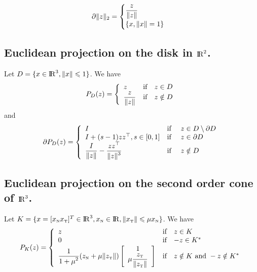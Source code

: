 \begin{equation}
  \label{eq:sub-norm}
  \partial \|z\|_2 =
  \begin{cases}
      \Frac z {\|z\|}\\
      \{x, \|x\|=1 \}
    \end{cases}
\end{equation}
\subsection{Euclidean projection on the disk  in $\mathrm{I\!R}^2$.}
Let $D=\{x \in \mathrm{I\!R}^3, \|x\| \leqslant 1\}$. We have 
\begin{equation}
  \label{eq:projD}
  P_{D}(z) =\left\{
  \begin{array}{lcl}
    z &\text{if}& z \in D \\
    \Frac {z} {\|z\|}& \text{if}&z \notin D
    \end{array}\right. 
  \end{equation}
 and
\begin{equation}
  \label{eq:sub-projD}
  \partial P_{D}(z) =\left\{
  \begin{array}{lcl}
   I &\text{if }& z \in D \setminus \partial D \\
   I + (s-1)z z^\top , s\in [0,1]   &\text{if }& z \in  \partial D \\
   \Frac I {\|z\|} - \Frac{z z^\top}{\|z\|^3} &\text{if }& z \notin D  
   \end{array}\right. 
\end{equation}


\subsection{Euclidean projection on the second order cone of $\mathrm{I\!R}^3$.}
Let $K=\{x = [x_{\hbox{\tiny{N}}} x_{\hbox{\tiny{T}}}]^T \in \mathrm{I\!R}^3, x_{\hbox{\tiny{N}}} \in \mathrm{I\!R}, \|x_{{\hbox{\tiny{T}}}}\| \leqslant \mu x_{{\hbox{\tiny{N}}}}\}$. We have 
\begin{equation}
  \label{eq:proj}
  P_{K}(z) =\left\{
  \begin{array}{lcl}
    z &\text{if}& z \in K \\
    0 &\text{if}& -z \in K^* \\
    \Frac 1 {1+\mu^2}(z_\n + \mu \|z_\t\| )
    \left[\begin{array}{c}
      1 \\
      \mu \Frac {z_\t} {\|z_\t\|}
      \end{array}\right]&\text{if}& z \notin K \text{ and } -z \notin K^*
    \end{array}\right. 
  \end{equation}

